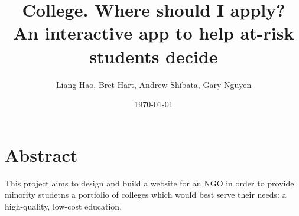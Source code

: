 \documentclass{article}
\title{College. Where should I apply? \\ An interactive app to help at-risk students decide}
\author{Liang Hao, Bret Hart, Andrew Shibata, Gary Nguyen}
\date{\today}
\begin{document}


\maketitle
\section{Abstract}

This project aims to design and build a website for an NGO in order to provide minority studetns a portfolio of colleges which would best serve their needs: a high-quality, low-cost education.
\end{document}
